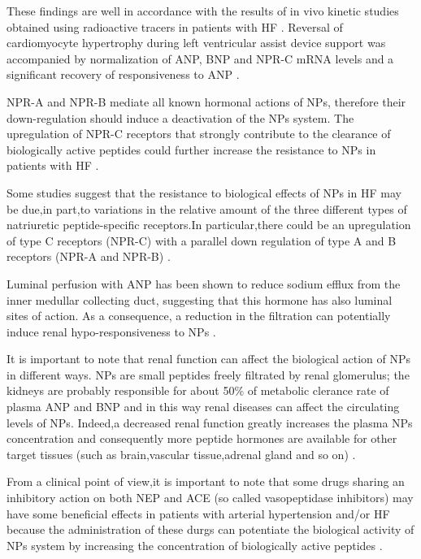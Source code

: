 \documentclass[14pt,a4paper,onecolumn]{extarticle}
\begin{document}
These findings are well in accordance with the results of in vivo kinetic studies obtained using radioactive tracers in patients with HF \citep{bib333}. Reversal of cardiomyocyte hypertrophy during left ventricular assist device support was accompanied by normalization of ANP, BNP and NPR-C mRNA levels and a significant recovery of responsiveness to ANP \citep{bib347}. %

NPR-A and NPR-B mediate all known hormonal actions of NPs, therefore their down-regulation should induce a deactivation of the NPs system. The upregulation of NPR-C receptors that strongly contribute to the clearance of biologically active peptides could further increase the resistance to NPs in patients with HF \citep{bib343}. %

Some studies suggest that the resistance to biological effects of NPs in HF may be due,in part,to variations in the relative amount of the three different types of natriuretic peptide-specific receptors.In particular,there could be an upregulation of type C receptors (NPR-C) with a parallel down regulation of type A and B receptors (NPR-A and NPR-B) \citep{bib343} \citep{bib347}. %

Luminal perfusion with ANP has been shown to reduce sodium efflux from the inner medullar collecting duct, suggesting that this hormone has also luminal sites of action.  As a consequence, a reduction in the filtration can potentially induce renal hypo-responsiveness to NPs \citep{bib325}. %

It is important to note that renal function can affect the biological action of NPs in different ways.  NPs are small peptides freely filtrated by renal glomerulus; the kidneys are probably responsible for about 50\% of metabolic clerance rate of plasma ANP and BNP and in this way renal diseases can affect the circulating levels of NPs.  Indeed,a decreased renal function greatly increases the plasma NPs concentration and consequently more peptide hormones are available for other target tissues (such as brain,vascular tissue,adrenal gland and so on) \citep{bib35}. %

From a clinical point of view,it is important to note that some drugs sharing an inhibitory action on both NEP and ACE (so called vasopeptidase inhibitors) may have some beneficial effects in patients with arterial hypertension and/or HF because the administration of these durgs can potentiate the biological activity of NPs system by increasing the concentration of biologically active peptides \citep{bib340} \citep{bib341} \citep{bib342}. %
\end{document}
